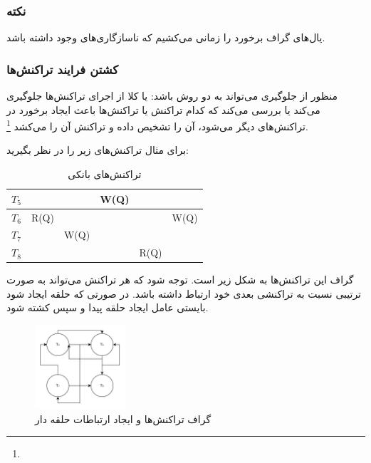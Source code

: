\subsubsection*{نکته}

یال‌های گراف برخورد را زمانی می‌کشیم که ناسازگاری‌های  وجود
داشته باشد.

\subsubsection{کشتن فرایند تراکنش‌ها}

منظور از جلوگیری می‌تواند به دو روش باشد: یا کلا از اجرای تراکنش‌ها جلوگیری
می‌کند یا بررسی می‌کند که کدام تراکنش یا تراکنش‌ها باعث ایجاد برخورد در
تراکنش‌های دیگر می‌شود، آن را تشخیص داده و تراکنش آن را می‌کشد \footnote{}.

\newpage

برای مثال تراکنش‌های زیر را در نظر بگیرید:

\begin{LTR}
    \begin{table}[h]
        \centering
        \begin{RTL}
            \caption{تراکنش‌های بانکی}
        \end{RTL}
        \begin{tabular}{|c|c|c|c|c|c|}
            \hline
            $T_{5}$ & & & W(Q) & & \\ \hline
            $T_{6}$ & R(Q) & & & & W(Q) \\ \hline
            $T_{7}$ & & W(Q) & & & \\ \hline
            $T_{8}$ & & & & R(Q) & \\ \hline
        \end{tabular}
    \end{table}
\end{LTR}

گراف این تراکنش‌ها به شکل زیر است. توجه شود که هر تراکنش می‌تواند به صورت ترتیبی
نسبت به تراکنشی بعدی خود ارتباط داشته باشد. در صورتی که حلقه ایجاد شود بایستی
عامل ایجاد حلقه پیدا و سپس کشته شود.

\begin{figure}[H]
    \centering
    \includegraphics[width=0.3\textwidth]{umls/exp1_serializable_graph.jpg}
    \caption{گراف تراکنش‌ها و ایجاد ارتباطات حلقه دار}
    \label{fig: diagram}
\end{figure}

